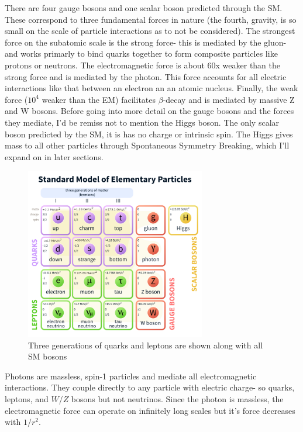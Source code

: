 There are four gauge bosons and one scalar boson predicted through the SM. These correspond to three fundamental forces in nature (the fourth, gravity, is so small on the scale of particle interactions as to not be considered). The strongest force on the subatomic scale is the strong force- this is mediated by the gluon- and works primarly to bind quarks together to form composite particles like protons or neutrons. The electromagnetic force is about 60x weaker than the strong force and is mediated by the photon. This force accounts for all electric interactions like that between an electron an an atomic nucleus. Finally, the weak force ($10^4$ weaker than the EM) facilitates $\beta$-decay and is mediated by massive Z and W bosons. Before going into more detail on the gauge bosons and the forces they mediate, I'd be remiss not to mention the Higgs boson. The only scalar boson predicted by the SM, it is has no charge or intrinsic spin. The Higgs gives mass to all other particles through Spontaneous Symmetry Breaking, which I'll expand on in later sections.
\begin{figure}[H]
	\centering
    \includegraphics[width=0.7\textwidth] {Pictures/SMparticles.png}\hspace{1cm}
    \caption{Three generations of quarks and leptons are shown along with all SM bosons \cite{PDG}}
    \label{fig:SMparticles}
\end{figure}
Photons are massless, spin-1 particles and mediate all electromagnetic interactions. They couple directly to any particle with electric charge- so quarks, leptons, and $W$/$Z$ bosons but not neutrinos. Since the photon is massless, the electromagnetic force can operate on infinitely long scales but it's force decreases with $1/r^2.$
 
